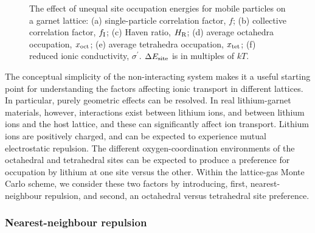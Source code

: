 \documentclass[aps,prb,twocolumn,superscriptaddress,reprint]{revtex4-1}
\begin{document}
\begin{figure}[tb]
  \centering
    \caption{\label{fig:site_energies_data}The effect of unequal site occupation energies for mobile particles on a garnet lattice: (a) single-particle correlation factor, $f$; (b) collective correlation factor, $f_{\mathrm{I}}$; (c) Haven ratio, $H_{\mathrm{R}}$; (d) average octahedra occupation, $x_{\mathrm{oct}}$; (e) average tetrahedra occupation, $x_{\mathrm{tet}}$; (f) reduced ionic conductivity, $\sigma^\prime$. $\Delta E_{\mathrm{site}}$ is in multiples of $kT$.}
\end{figure}

The conceptual simplicity of the non-interacting system makes it a useful starting point for understanding the factors affecting ionic transport in different lattices. In particular, purely geometric effects can be resolved.
In real lithium-garnet materials, however, interactions exist between lithium ions, and between lithium ions and the host lattice, and these can significantly affect ion transport. 
Lithium ions are positively charged, and can be expected to experience mutual electrostatic repulsion. The different oxygen-coordination environments of the octahedral and tetrahedral sites can be expected to produce a preference for occupation by lithium at one site versus the other.\cite{WangEtAl_NatMater2015} 
Within the lattice-gas Monte Carlo scheme, we consider these two factors by introducing, first, nearest-neighbour repulsion, and second, an octahedral versus tetrahedral site preference.

\subsubsection{Nearest-neighbour repulsion}
\end{document}
